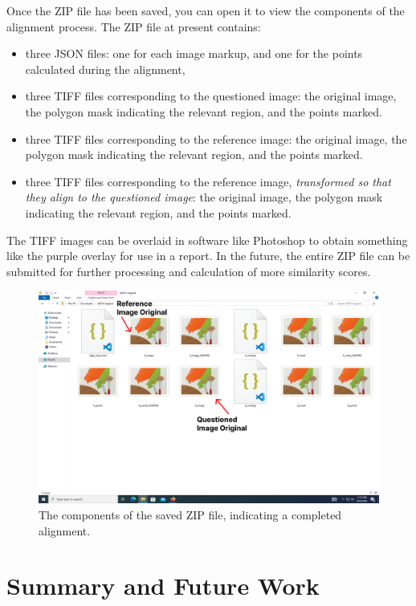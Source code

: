 \documentclass[a4paper, oneside]{memoir}
\begin{document}
Once the ZIP file has been saved, you can open it to view the components of the alignment
process. The ZIP file at present contains: 

\begin{itemize}
	\item three JSON files: one for each image markup, and one for the points calculated
		during the alignment,
	\item three TIFF files corresponding to the questioned image: the original image, the
		polygon mask indicating the relevant region, and the points marked.
	\item three TIFF files corresponding to the reference image: the original image, the
		polygon mask indicating the relevant region, and the points marked.
	\item three TIFF files corresponding to the reference image, \textit{transformed so
		that they align to the questioned image}: the original image, the
		polygon mask indicating the relevant region, and the points marked.
\end{itemize}

The TIFF images can be overlaid in software like Photoshop to obtain something like the
purple overlay for use in a report. In the future, the entire ZIP file can be submitted
for further processing and calculation of more similarity scores.

\begin{figure}[H]
\begin{center}
	\includegraphics[width=0.8\linewidth]{images/step_10-anno.png}
\end{center}
\caption{The components of the saved ZIP file, indicating a completed alignment.}
\label{fig:step10}
\end{figure}




\newpage
\chapter{Summary and Future Work}%
\end{document}
